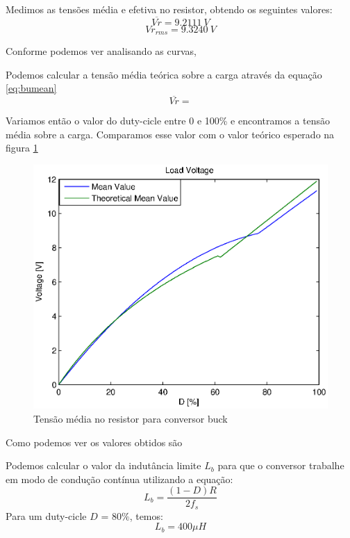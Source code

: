 \documentclass{article}
\begin{document}
Medimos as tensões média e efetiva no resistor, obtendo os seguintes valores:
\begin{equation}
\overline{Vr} = 9.2111\ V
\end{equation}
\begin{equation}
Vr_{rms} = 9.3240\ V
\end{equation}

Conforme podemos ver analisando as curvas, %

Podemos calcular a tensão média teórica sobre a carga através da equação \ref{eq:bumean}
\begin{equation}
\overline{Vr} = 
\label{eq:bumean}
\end{equation}

Variamos então o valor do duty-cicle entre 0 e 100\% e encontramos a tensão média sobre a carga. Comparamos esse valor com o valor teórico esperado na figura \ref{fig:buvrxd}
\begin{figure}[H]
	\centering
	\includegraphics[width=0.7\linewidth]{matlab/buck/r_vrxd}
	\caption{Tensão média no resistor para conversor buck}
	\label{fig:buvrxd}
\end{figure}

Como podemos ver os valores obtidos são %

Podemos calcular o valor da indutância limite $L_b$ para que o conversor trabalhe em modo de condução contínua utilizando a equação:
\begin{equation}
L_b = \frac{(1 - D)R}{2f_s}
\end{equation}
Para um duty-cicle $D$ = $80\%$, temos:
\begin{equation}
L_b = 400\mu H
\end{equation}
\end{document}

